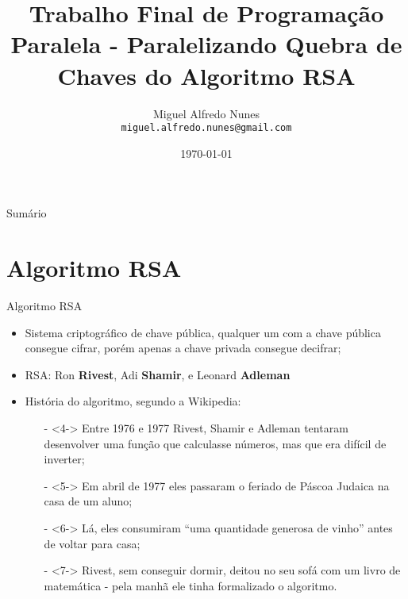 \documentclass[xcolor=table]{beamer}
\title[]{Trabalho Final de Programação Paralela - Paralelizando Quebra de Chaves do Algoritmo RSA}
\author[Miguel Alfredo Nunes]{
    Miguel Alfredo Nunes\\\smallskip
    \texttt{miguel.alfredo.nunes@gmail.com}
}
\date{\today}
\begin{document}
    
    \begin{frame}
        \titlepage
    \end{frame}

    \begin{frame}[allowframebreaks]{Sumário}
        \tableofcontents
    \end{frame}

    \section[]{Algoritmo RSA}
    \begin{frame}{Algoritmo RSA}
        \begin{itemize}
            \item<1-> Sistema criptográfico de chave pública, qualquer um com a chave pública consegue cifrar, 
                    porém apenas a chave privada consegue decifrar;
            \item<2-> RSA: Ron \textbf{Rivest}, Adi \textbf{Shamir}, e Leonard \textbf{Adleman}
            \item<3-> História do algoritmo, segundo a Wikipedia:
                \begin{itemize}
                    \item[-]<4-> Entre 1976 e 1977 Rivest, Shamir e Adleman tentaram desenvolver uma função que calculasse números, 
                                mas que era difícil de inverter;%
                    \item[-]<5-> Em abril de 1977 eles passaram o feriado de Páscoa Judaica na casa de um aluno;
                    \item[-]<6-> Lá, eles consumiram ``uma quantidade generosa de vinho'' antes de voltar para casa;
                    \item[-]<7-> Rivest, sem conseguir dormir, deitou no seu sofá com um livro de matemática - pela manhã ele tinha
                                formalizado o algoritmo.
                \end{itemize}
        \end{itemize}
    \end{frame}
    
\end{document}
